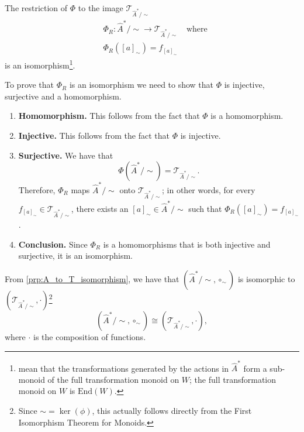 \begin{propositionE}
\label{prp:A_to_T_isomorphism}
    The restriction of $\Phi$ to the image $\mathcal{T}_{\hat{A}^{*}/\sim}$
    \begin{equation}
    \begin{aligned}
        & \Phi_{R} : \hat{A}^{*}/\sim \to \mathcal{T}_{\hat{A}^{*}/\sim} \quad \text{where} \\
        & \Phi_{R}([a]_{\sim}) = f_{[a]_{\sim}}
    \end{aligned}
    \end{equation}
    is an isomorphism\footnote{
     mean that the transformations generated by the actions in $\hat{A}^{*}$ form a sub-monoid of the full transformation monoid on $W$; the full transformation monoid on $W$ is $\text{End}(W)$.
    }.
\end{propositionE}
\begin{proofE}
    To prove that $\Phi_{R}$ is an isomorphism we need to show that $\Phi$ is injective, surjective and a homomorphism.
    \begin{enumerate}
    \item \textbf{Homomorphism.}
    This follows from the fact that $\Phi$ is a homomorphism.
    
    \item \textbf{Injective.}
    This follows from the fact that $\Phi$ is injective.
    
    \item \textbf{Surjective.}
    We have that
    \begin{equation}
        \Phi(\hat{A}^{*}/\sim) = \mathcal{T}_{\hat{A}^{*}/\sim}.
    \end{equation}
    Therefore, $\Phi_{R}$ maps $\hat{A}^{*}/\sim$ onto $\mathcal{T}_{\hat{A}^{*}/\sim}$; in other words, for every $f_{[a]_{\sim}} \in \mathcal{T}_{\hat{A}^{*}/\sim}$, there exists an $[a]_{\sim} \in \hat{A}^{*}/\sim$ such that $\Phi_{R}([a]_{\sim}) = f_{[a]_{\sim}}$.

    \item \textbf{Conclusion.}
    Since $\Phi_{R}$ is a homomorphisms that is both injective and surjective, it is an isomorphism.
\end{enumerate}
\end{proofE}

From \cref{prp:A_to_T_isomorphism}, we have that $(\hat{A}^{*}/\sim, \circ_{\sim})$ is isomorphic to $(\mathcal{T}_{\hat{A}^{*}/\sim}, \cdot)$\footnote{
    Since $\sim = \operatorname{ker}(\phi)$, this actually follows directly from the First Isomorphism Theorem for Monoids.
}
\begin{equation}
    (\hat{A}^{*}/\sim, \circ_{\sim}) \cong (\mathcal{T}_{\hat{A}^{*}/\sim}, \cdot),
\end{equation}
where $\cdot$ is the composition of functions.

